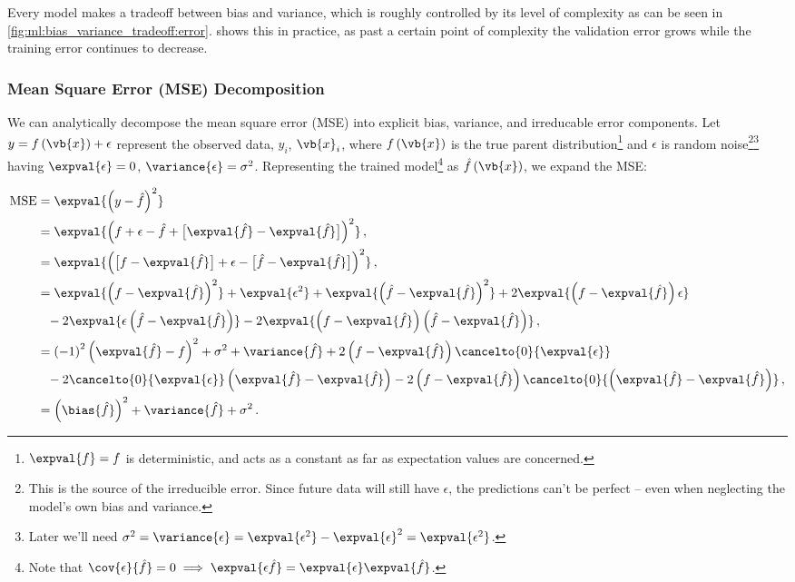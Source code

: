 Every model makes a tradeoff between bias and variance,
which is roughly controlled by its level of complexity
as can be seen in \cref{fig:ml:bias_variance_tradeoff:error}.
 shows this in practice,
as past a certain point of complexity the validation error grows
while the training error continues to decrease.

\subsubsection{Mean Square Error (MSE) Decomposition}
\label{ml_general:bias_variance_tradeoff:decop}

We can analytically decompose the mean square error (MSE) into explicit
bias, variance, and irreducable error components.
Let $y = f\left(\vb{x}\right) + \epsilon$ represent
the observed data, $y_{i}$, $\vb{x}_{i}$,
where $f\left(\vb{x}\right)$ is the true parent distribution\footnote{$\expval{f} = f$ is deterministic,
and acts as a constant as far as expectation values are concerned.} and
$\epsilon$ is random noise\footnote{This is the source of the irreducible error.
Since future data will still have $\epsilon$, the predictions can't be perfect
-- even when neglecting the model's own bias and variance.}\footnote{Later we'll need
$\sigma^{2} = \variance{\epsilon} = \expval{\epsilon^{2}} - \expval{\epsilon}^{2} = \expval{\epsilon^{2}}$.} having
$\expval{\epsilon} = 0$, $\variance{\epsilon} = \sigma^{2}$.
Representing the trained model\footnote{Note
that $\cov{\epsilon}{\hat{f}} = 0 \implies \expval{\epsilon \hat{f}} = \expval{\epsilon} \expval{\hat{f}}$.} as
$\hat{f}\left(\vb{x}\right)$, we expand the MSE:

\begin{subequations} \label{eq:bias_variance_tradeoff:decop}
\begin{align}
\text{MSE} &= \expval{\left(y-\hat{f}\right)^{2}} \\
&= \expval{\left(f + \epsilon - \hat{f} + \big[\expval{\hat{f}}-\expval{\hat{f}}\big]\right)^{2}}\,, \\
&= \expval{\left(\big[f - \expval{\hat{f}}\big] + \epsilon - \big[\hat{f} - \expval{\hat{f}}\big]\right)^{2}}\,, \\
&= \expval{\left(f-\expval{\hat{f}}\right)^{2}}
+\expval{\epsilon^{2}}
+\expval{\left(\hat{f}-\expval{\hat{f}}\right)^{2}}
+2\expval{\left(f-\expval{\hat{f}}\right)\epsilon} \\
&\hphantom{=}-2\expval{\epsilon\left(\hat{f}-\expval{\hat{f}}\right)}
-2\expval{\left(f-\expval{\hat{f}}\right)\left(\hat{f}-\expval{\hat{f}}\right)}\,, \\
&= \left(-1\right)^{2}\left(\expval{\hat{f}}-f\right)^{2} +\sigma^{2} + \variance{\hat{f}}
+2\left(f-\expval{\hat{f}}\right)\cancelto{0}{\expval{\epsilon}} \\
&\hphantom{=}-2\cancelto{0}{\expval{\epsilon}}\left(\expval{\hat{f}}-\expval{\hat{f}}\right)
-2\left(f-\expval{\hat{f}}\right)\cancelto{0}{\left(\expval{\hat{f}}-\expval{\hat{f}}\right)}\,, \\
&= \left(\bias{\hat{f}}\right)^{2} + \variance{\hat{f}} + \sigma^{2}\,.
\end{align}
\end{subequations}

